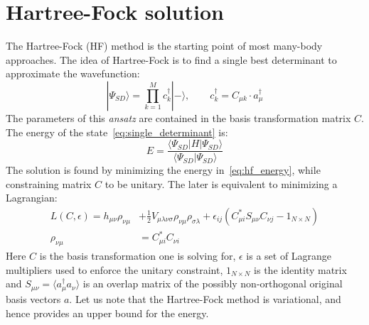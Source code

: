 \section{Hartree-Fock solution}
The Hartree-Fock (HF) method is the starting point of most many-body approaches.
The idea of Hartree-Fock is to find a single best determinant to 
approximate the wavefunction:
%
\begin{equation}
 |\Psi_{SD} \rangle = \prod_{k=1}^{M} c_k^{\dagger} | -\rangle, \qquad 
c_{k}^{\dagger} = C_{\mu k} \cdot a^{\dagger}_{\mu}
\label{eq:single_determinant}
\end{equation}
% 
The parameters of this \emph{ansatz} are contained in the basis transformation 
matrix $C$. The energy 
of the state~\ref{eq:single_determinant} is:
%
\begin{equation}
 E = \frac{\langle \Psi_{SD} | H | \Psi_{SD} \rangle}{\langle \Psi_{SD} | 
\Psi_{SD} \rangle}
 \label{eq:hf_energy}
\end{equation}
%
The solution is found by minimizing the energy in~\ref{eq:hf_energy}, 
while constraining matrix $C$ to be unitary. The later is equivalent to 
minimizing a Lagrangian:
%
\begin{equation}
\begin{aligned}
L(C, \epsilon) = h_{\mu \nu} \rho_{\nu \mu} &+ \frac{1}{2} 
V_{\mu \lambda \nu \sigma} \rho_{\nu \mu } \rho_{\sigma \lambda}  + 
\epsilon_{ij}(C^{\ast}_{\mu i} S_{\mu \nu} C_{\nu j} - 1_{N \times N})\\
\rho_{\nu \mu} &= C^{\ast}_{\mu i} C_{\nu i} 
\label{eq:hf_lagrangian}
\end{aligned}
\end{equation}
%
Here $C$ is the basis transformation one is solving for, $\epsilon$ is a 
set of Lagrange multipliers used to enforce the unitary constraint, $1_{N 
\times N}$ is the identity matrix and $S_{\mu \nu} = \langle a^{\dagger}_{\mu} 
a_{\nu} \rangle $ is an overlap matrix of the possibly non-orthogonal original 
basis vectors $a$. Let us note that the Hartree-Fock method 
is variational, and hence provides an upper bound for
the energy.\cite{levine2000quantum} 

